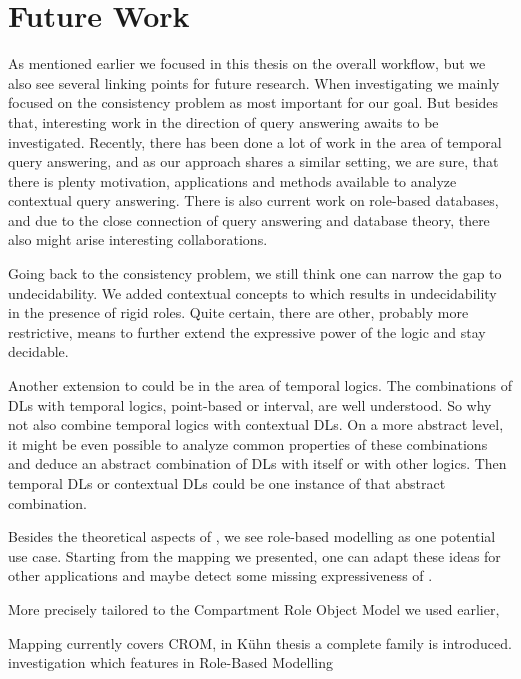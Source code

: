 \section{Future Work}
\label{sec:future-work}

As mentioned earlier we focused in this thesis on the overall workflow, but we also see several
linking points for future research. When investigating \LMLO we mainly focused on the consistency
problem as most important for our goal. But besides that, interesting work in the direction of query
answering awaits to be investigated. Recently, there has been done a lot of work in the area of
temporal query answering, and as our approach shares a similar setting, we are sure, that there is
plenty motivation, applications and methods available to analyze contextual query answering. There
is also current work on role-based databases, and due to the close connection of query answering and
database theory, there also might arise interesting collaborations.

Going back to the consistency problem, we still think one can narrow the gap to undecidability. We
added contextual concepts to \LMLO which results in undecidability in the presence of rigid
roles. Quite certain, there are other, probably more restrictive, means to further extend the
expressive power of the logic and stay decidable.

Another extension to \LMLO could be in the area of temporal logics. The combinations of DLs with
temporal logics, point-based or interval, are well understood. So why not also combine temporal
logics with contextual DLs. On a more abstract level, it might be even possible to analyze common
properties of these combinations and deduce an abstract combination of DLs with itself or with other
logics. Then temporal DLs or contextual DLs could be one instance of that abstract combination.

Besides the theoretical aspects of \LMLO, we see role-based modelling as one potential
use case. Starting from the mapping we presented, one can adapt these ideas for other applications
and maybe detect some missing expressiveness of \LMLO.

More precisely tailored to the Compartment Role Object Model we used earlier, 
 
\vspace*{3cm}

Mapping currently covers CROM, in Kühn thesis a complete family is introduced. investigation which
features in Role-Based Modelling 


